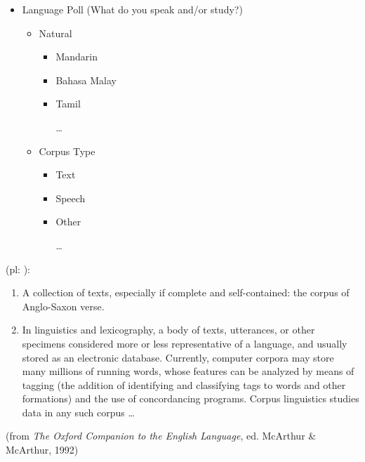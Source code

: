 \documentclass[a4paper,landscape,headrule,footrule,xetex]{foils}
\begin{document}

\begin{itemize}
\item Language Poll (What do you speak and/or study?)
  \begin{itemize}
  \item Natural
    \begin{itemize}
    \item Mandarin
    \item Bahasa Malay
    \item Tamil
    \item[\ldots]
    \end{itemize}
  \item Corpus Type
    \begin{itemize}
    \item Text
    \item Speech
    \item Other
    \item[\ldots]
    \end{itemize}
  \end{itemize}


\end{itemize}




 (pl: ):
\begin{enumerate}
\item A collection of texts, especially if
complete and self-contained: the corpus of
Anglo-Saxon verse.
\item In linguistics and lexicography, a body of texts, utterances, or other
specimens considered more or less representative
of a language, and usually stored as an electronic
database. Currently, computer corpora may store
many millions of running words, whose features can
be analyzed by means of tagging (the addition of
identifying and classifying tags to words and other
formations) and the use of concordancing
programs. Corpus linguistics studies data in any
such corpus \ldots
\end{enumerate}
(from \textit{The Oxford Companion to the English Language}, ed.
McArthur \& McArthur, 1992)
\end{document}
